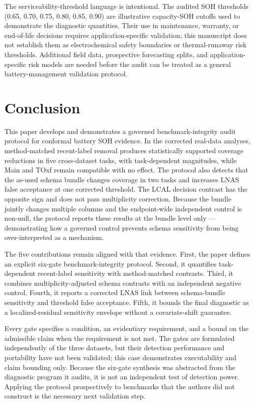 \documentclass[
  number,
  preprint]{elsarticle}
\begin{document}
The serviceability-threshold language is intentional. The audited SOH
thresholds (0.65, 0.70, 0.75, 0.80, 0.85, 0.90) are illustrative
capacity-SOH cutoffs used to demonstrate the diagnostic quantities.
Their use in maintenance, warranty, or end-of-life decisions requires
application-specific validation; this manuscript does not establish them
as electrochemical safety boundaries or thermal-runaway risk thresholds.
Additional field data, prospective forecasting splits, and
application-specific risk models are needed before the audit can be
treated as a general battery-management validation protocol.

\section{Conclusion}\label{sec-conclusion}

This paper develops and demonstrates a governed benchmark-integrity
audit protocol for conformal battery SOH evidence. In the corrected
real-data analyses, method-matched recent-label removal produces
statistically supported coverage reductions in five cross-dataset tasks,
with task-dependent magnitudes, while Main and TOxf remain compatible
with no effect. The protocol also detects that the as-used schema bundle
changes coverage in two tasks and increases LNAS false acceptance at one
corrected threshold. The LCAL decision contrast has the opposite sign
and does not pass multiplicity correction. Because the bundle jointly
changes multiple columns and the endpoint-wide independent control is
non-null, the protocol reports these results at the bundle level only
--- demonstrating how a governed control prevents schema sensitivity
from being over-interpreted as a mechanism.

The five contributions remain aligned with that evidence. First, the
paper defines an explicit six-gate benchmark-integrity protocol. Second,
it quantifies task-dependent recent-label sensitivity with
method-matched contrasts. Third, it combines multiplicity-adjusted
schema contrasts with an independent negative control. Fourth, it
reports a corrected LNAS link between schema-bundle sensitivity and
threshold false acceptance. Fifth, it bounds the final diagnostic as a
localized-residual sensitivity envelope without a covariate-shift
guarantee.

Every gate specifies a condition, an evidentiary requirement, and a
bound on the admissible claim when the requirement is not met. The gates
are formulated independently of the three datasets, but their detection
performance and portability have not been validated; this case
demonstrates executability and claim bounding only. Because the six-gate
synthesis was abstracted from the diagnostic program it audits, it is
not an independent test of detection power. Applying the protocol
prospectively to benchmarks that the authors did not construct is the
necessary next validation step.
\end{document}
